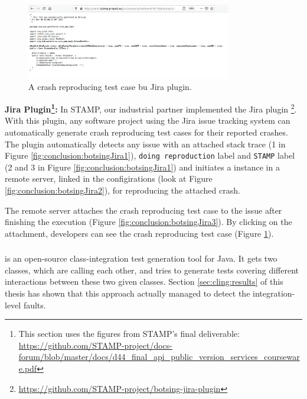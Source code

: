 \begin{figure}
    \includegraphics[width=0.8\textwidth]{conclusion/figures/deliverables_wp4_d44_images_jira-generated-test-case.png}
    \caption{A crash reproducing test case bu \botsing Jira plugin.}
    \label{fig:conclusion:botsingJira4}
\end{figure}

\textbf{\botsing Jira Plugin\footnote{This section uses the figures from STAMP's final deliverable: \url{https://github.com/STAMP-project/docs-forum/blob/master/docs/d44_final_api_public_version_services_courseware.pdf}}:}
In STAMP, our industrial partner implemented the \botsing Jira plugin \footnote{\url{https://github.com/STAMP-project/botsing-jira-plugin}}.
With this plugin, any software project using the Jira issue tracking system can automatically generate crash reproducing test cases for their reported crashes. The plugin automatically detects any issue with an attached stack trace (1 in Figure \ref{fig:conclusion:botsingJira1}), \texttt{doing reproduction} label and \texttt{STAMP} label (2 and 3 in Figure \ref{fig:conclusion:botsingJira1}) and initiates a \botsing instance in a remote server, linked in the configirations (look at Figure \ref{fig:conclusion:botsingJira2}), for reproducing the attached crash. 


The remote server attaches the crash reproducing test case to the issue after finishing the \botsing execution (Figure \ref{fig:conclusion:botsingJira3}). By clicking on the attachment, developers can see the crash reproducing test case (Figure \ref{fig:conclusion:botsingJira4}).



\subsubsection{\cling}

\cling is an open-source class-integration test generation tool for Java. It gets two classes, which are calling each other, and tries to generate tests covering different interactions between these two given classes. Section \ref{sec:cling:results} of this thesis has shown that this approach actually managed to detect the integration-level faults. 

